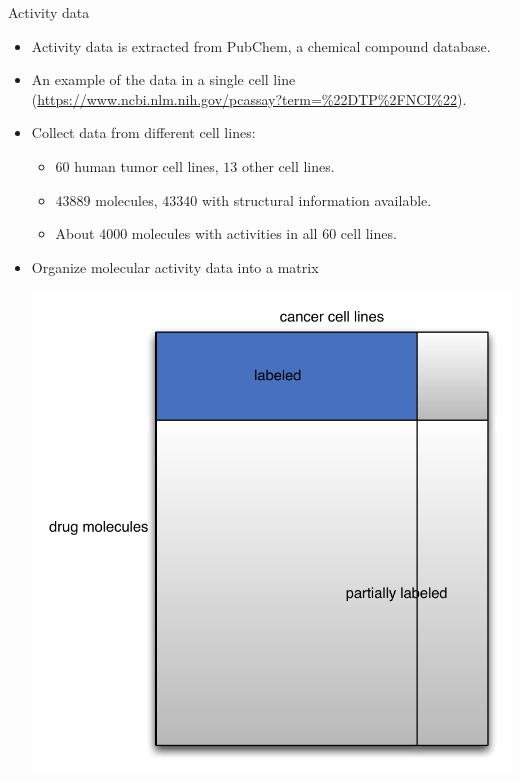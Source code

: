 \documentclass[first=dgreen,second=purple,logo=yellowexc]{aaltoslides}
\begin{document}
{\begin{frame}{Activity data}
	\begin{itemize}
		\item Activity data is extracted from PubChem, a chemical compound database.
		\item An example of the data in a single cell line (\url{https://www.ncbi.nlm.nih.gov/pcassay?term=\%22DTP\%2FNCI\%22}).
		\item Collect data from different cell lines:
		\begin{itemize}
			\footnotesize
			\item $60$ human tumor cell lines, $13$ other cell lines.
			\item $43889$ molecules, $43340$ with structural information available.
			\item About $4000$ molecules with activities in all $60$ cell lines.
		\end{itemize}
		\item Organize molecular activity data into a matrix
		\begin{center}
			\includegraphics[scale=0.25]{./figures/datamatrix.pdf}
		\end{center}
	\end{itemize}
\end{frame}





}
\end{document}
